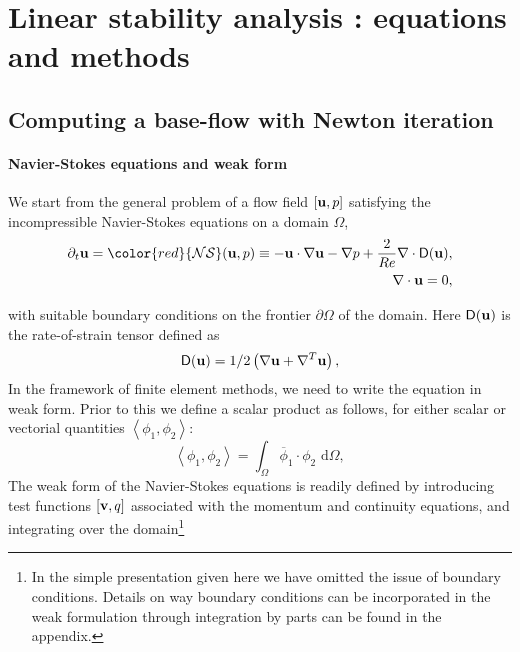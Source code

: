 \documentclass[twocolumn,10pt]{asme2ej}
\begin{document}

\section{Linear stability analysis : equations and methods}
\vspace{.2cm}

\subsection{Computing a base-flow with Newton iteration}
\vspace{.2cm}

\paragraph{Navier-Stokes equations and weak form}

We start from the general problem of a flow field $[{\bf u},p]$ satisfying the incompressible Navier-Stokes equations on a domain $\Omega$,
\begin{eqnarray} \label{NSprimitive}
\partial_t {\bf u} = {\color{red}{\cal NS} ({\bf u},p)}
\equiv - {\bf u} \cdot \nabla {\bf u} - \nabla p + \frac{2}{Re}  \nabla \cdot {\mathsf{D}}({\bf u}),  \\
\nabla \cdot {\bf u} = 0,
\end{eqnarray}

with suitable boundary conditions on the frontier $\partial \Omega$ of the domain.
Here $ {\mathsf{D}}({\bf u}) $ is the rate-of-strain tensor defined as
$$
 {\mathsf{D}}({\bf u}) = 1/2
\left( \nabla {\bf u} +  \nabla^T  {\bf u}\right),
$$ 
In the framework of finite element methods, we need to write the equation in weak form.
Prior to this we define a scalar product as follows, for either scalar or vectorial quantities 
$\left< \phi_1, \phi_2 \right> $:
$$
\left< \phi_1, \phi_2 \right> = \int_\Omega \overline{\phi}_1 \cdot \phi_2   \mbox{ d} \Omega,
$$
The weak form of the Navier-Stokes equations is readily defined by introducing test functions 
$[{\bf v},q]$ associated with the momentum and continuity equations, and integrating over the domain\footnote{In the simple presentation given here we have omitted the issue of boundary conditions. Details on way boundary conditions can be incorporated in the weak formulation through integration by parts can be found in the appendix.}
\end{document}
